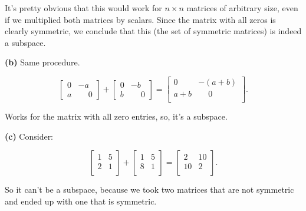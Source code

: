 \documentclass{article}
\begin{document}
It's pretty obvious that this would work for $n \times n$ matrices of arbitrary size, even if we multiplied both matrices by scalars. Since the matrix with all zeros is clearly symmetric, we conclude that this (the set of symmetric matrices) is indeed a subspace.

\noindent \textbf{(b)} Same procedure.

\[
\begin{bmatrix}
0 & -a\\
a & \phantom{-}0
\end{bmatrix}
+
\begin{bmatrix}
0 & -b\\
b & \phantom{-}0
\end{bmatrix}
=
\begin{bmatrix}
0 & - (a + b)\\
a + b & \phantom{-}0\\
\end{bmatrix}.
\]

Works for the matrix with all zero entries, so, it's a subspace.

\noindent \textbf{(c)} Consider:

\[
\begin{bmatrix}
1 & 5\\
2 & 1\\
\end{bmatrix}
+
\begin{bmatrix}
1 & 5\\
8 & 1\\
\end{bmatrix}
=
\begin{bmatrix}
2 & 10\\
10 & 2\\
\end{bmatrix}.
\]

So it can't be a subspace, because we took two matrices that are not symmetric and ended up with one that is symmetric.
\end{document}
